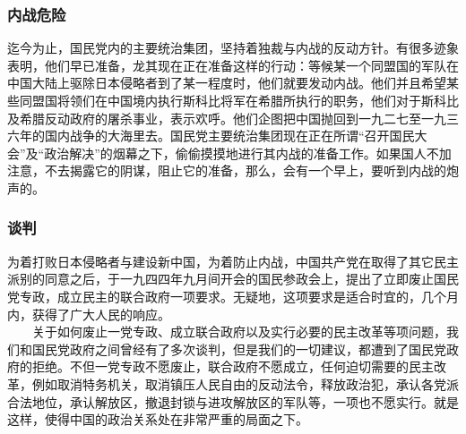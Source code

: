 \documentclass[cn,11pt,chinese]{elegantbook}
\def\myformat#1{\hfil\hfil #1}
\begin{document}
\subsubsection*{\myformat{内战危险}}
迄今为止，国民党内的主要统治集团，坚持着独裁与内战的反动方针。有很多迹象表明，他们早已准备，龙其现在正在准备这样的行动：等候某一个同盟国的军队在中国大陆上驱除日本侵略者到了某一程度时，他们就要发动内战。他们并且希望某些同盟国将领们在中国境内执行斯科比将军在希腊所执行的职务，他们对于斯科比及希腊反动政府的屠杀事业，表示欢呼。他们企图把中国抛回到一九二七至一九三六年的国内战争的大海里去。国民党主要统治集团现在正在所谓“召开国民大会”及“政治解决”的烟幕之下，偷偷摸摸地进行其内战的准备工作。如果国人不加注意，不去揭露它的阴谋，阻止它的准备，那么，会有一个早上，要听到内战的炮声的。\\
\subsubsection*{\myformat{谈判}}
为着打败日本侵略者与建设新中国，为着防止内战，中国共产党在取得了其它民主派别的同意之后，于一九四四年九月间开会的国民参政会上，提出了立即废止国民党专政，成立民主的联合政府一项要求。无疑地，这项要求是适合时宜的，几个月内，获得了广大人民的响应。\\
　　关于如何废止一党专政、成立联合政府以及实行必要的民主改革等项问题，我们和国民党政府之间曾经有了多次谈判，但是我们的一切建议，都遭到了国民党政府的拒绝。不但一党专政不愿废止，联合政府不愿成立，任何迫切需要的民主改革，例如取消特务机关，取消镇压人民自由的反动法令，释放政治犯，承认各党派合法地位，承认解放区，撤退封锁与进攻解放区的军队等，一项也不愿实行。就是这样，使得中国的政治关系处在非常严重的局面之下。\\
\end{document}
